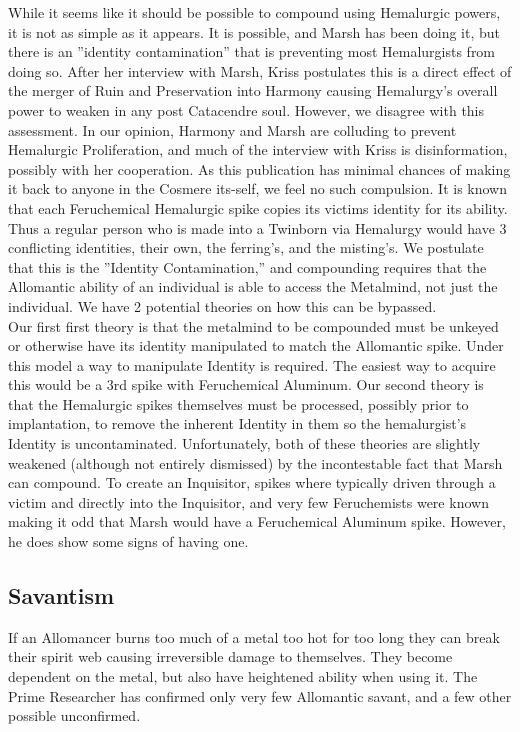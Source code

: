 \documentclass[conference]{IEEEtran}
\newcommand{\n}{\hfill\break}
\begin{document}
While it seems like it should be possible to compound using Hemalurgic powers, it is not as simple as it appears.  It is possible, and Marsh has been doing it,\cite{ARS-TLM} but there is an ''identity contamination'' that is preventing most Hemalurgists from doing so.\cite{TLM-CH28}  After her interview with Marsh, Kriss postulates this is a direct effect of the merger of Ruin and Preservation into Harmony causing Hemalurgy's overall power to weaken in any post Catacendre soul.\cite{ARS-TLM}  However, we disagree with this assessment.  In our opinion, Harmony and Marsh are colluding to prevent Hemalurgic Proliferation, and much of the interview with Kriss is disinformation, possibly with her cooperation.  As this publication has minimal chances of making it back to anyone in the Cosmere its-self, we feel no such compulsion.  It is known that each Feruchemical Hemalurgic spike copies its victims identity for its ability.\cite{HE-Fe-access} Thus a regular person who is made into a Twinborn via Hemalurgy would have 3 conflicting identities, their own, the ferring's, and the misting's.  We postulate that this is the ''Identity Contamination,'' and compounding requires that the Allomantic ability of an individual is able to access the Metalmind, not just the individual.  We have 2 potential theories on how this can be bypassed.  \\
\indent Our first first theory is that the metalmind to be compounded must be unkeyed or otherwise have its identity manipulated to match the Allomantic spike.  Under this model a way to manipulate Identity is required.  The easiest way to acquire this would be a 3rd spike with Feruchemical Aluminum.\cite{ARS}\n
\indent Our second theory is that the Hemalurgic spikes themselves must be processed, possibly prior to implantation, to remove the inherent Identity in them so the hemalurgist's Identity is uncontaminated.  \n
Unfortunately, both of these theories are slightly weakened (although not entirely dismissed) by the incontestable fact that Marsh can compound.\cite{ARS}  To create an Inquisitor, spikes where typically driven through a victim and directly into the Inquisitor,\cite{HoA-pre} and very few Feruchemists were known making it odd that Marsh would have a Feruchemical Aluminum spike.  However, he does show some signs of having one.\cite{TLM-2YAD}
\subsection*{\textbf{Savantism}}
If an Allomancer burns too much of a metal too hot for too long they can break their spirit web causing irreversible damage to themselves.\cite{WoF}  They become dependent on the metal, but also have heightened ability when using it.\cite{HoA-EP}  The Prime Researcher has confirmed only very few Allomantic savant, and a few other possible unconfirmed.
\end{document}
